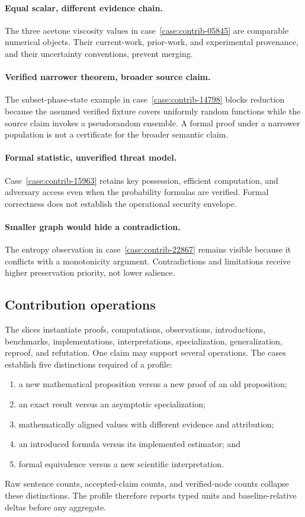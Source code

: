 \paragraph{Equal scalar, different evidence chain.}
The three acetone viscosity values in case~\ref{case:contrib-05845} are comparable numerical objects. Their current-work, prior-work, and experimental provenance, and their uncertainty conventions, prevent merging.

\paragraph{Verified narrower theorem, broader source claim.}
The subset-phase-state example in case~\ref{case:contrib-14798} blocks reduction because the assumed verified fixture covers uniformly random functions while the source claim invokes a pseudorandom ensemble. A formal proof under a narrower population is not a certificate for the broader semantic claim.

\paragraph{Formal statistic, unverified threat model.}
Case~\ref{case:contrib-15963} retains key possession, efficient computation, and adversary access even when the probability formulas are verified. Formal correctness does not establish the operational security envelope.

\paragraph{Smaller graph would hide a contradiction.}
The entropy observation in case~\ref{case:contrib-22867} remains visible because it conflicts with a monotonicity argument. Contradictions and limitations receive higher preservation priority, not lower salience.

\subsection{Contribution operations}

The slices instantiate proofs, computations, observations, introductions, benchmarks, implementations, interpretations, specialization, generalization, reproof, and refutation. One claim may support several operations. The cases establish five distinctions required of a profile:
\begin{enumerate}
  \item a new mathematical proposition versus a new proof of an old proposition;
  \item an exact result versus an asymptotic specialization;
  \item mathematically aligned values with different evidence and attribution;
  \item an introduced formula versus its implemented estimator; and
  \item formal equivalence versus a new scientific interpretation.
\end{enumerate}
Raw sentence counts, accepted-claim counts, and verified-node counts collapse these distinctions. The profile therefore reports typed units and baseline-relative deltas before any aggregate.

